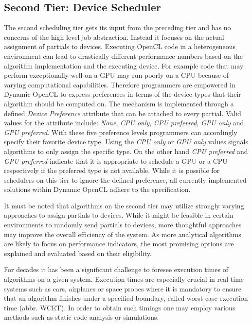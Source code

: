 \subsection{Second Tier: Device Scheduler}
The second scheduling tier gets its input from the preceding tier and has no concerns of the high level job abstraction. Instead it focuses on the actual assignment of partials to devices. Executing OpenCL code in a heterogeneous environment can lead to drastically different performance numbers based on the algorithm implementation and the executing device. For example code that may perform exceptionally well on a GPU may run poorly on a CPU because of varying computational capabilities. Therefore programmers are empowered in Dynamic OpenCL to express preferences in terms of the device types that their algorithm should be computed on. The mechanism is implemented through a defined \textit{Device Preference} attribute that can be attached to every partial. Valid values for the attribute include: \textit{None}, \textit{CPU only}, \textit{CPU preferred}, \textit{GPU only} and \textit{GPU preferred}. With these five preference levels programmers can accordingly specify their favorite device type. Using the \textit{CPU only} or \textit{GPU only} values signals algorithms to only assign the specific type. On the other hand \textit{CPU preferred} and \textit{GPU preferred} indicate that it is appropriate to schedule a GPU or a CPU respectively if the preferred type is not available. While it is possible for schedulers on this tier to ignore the defined preference, all currently implemented solutions within Dynamic OpenCL adhere to the specification.

It must be noted that algorithms on the second tier may utilize strongly varying approaches to assign partials to devices. While it might be feasible in certain environments to randomly send partials to devices, more thoughtful approaches may improve the overall efficiency of the system. As more analytical algorithms are likely to focus on performance indicators, the most promising options are explained and evaluated based on their eligibility.

For decades it has been a significant challenge to foresee execution times of algorithms on a given system. Execution times are especially crucial in real time systems such as cars, airplanes or space probes where it is mandatory to ensure that an algorithm finishes under a specified boundary, called worst case execution time (abbr. WCET). In order to obtain such timings one may employ various methods such as static code analysis or simulations\cite{wcet}.

